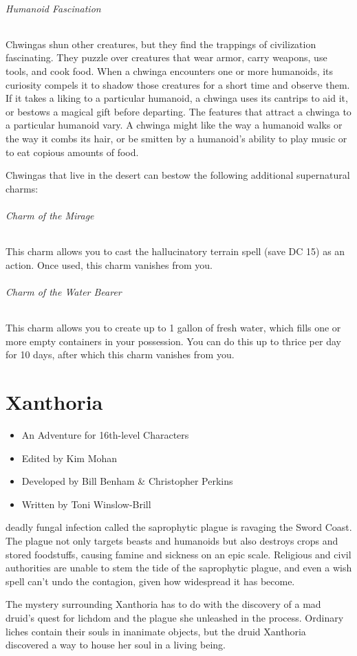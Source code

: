 \documentclass[10pt,a4paper,twoside,bg=print,twocolumn,openany,nodeprecatedcode]{dndbook}
\begin{document}
\subparagraph{Humanoid Fascination}
Chwingas shun other creatures, but they find the trappings of civilization fascinating. They puzzle over creatures that wear armor, carry weapons, use tools, and cook food. When a chwinga encounters one or more humanoids, its curiosity compels it to shadow those creatures for a short time and observe them. If it takes a liking to a particular humanoid, a chwinga uses its cantrips to aid it, or bestows a magical gift before departing. The features that attract a chwinga to a particular humanoid vary. A chwinga might like the way a humanoid walks or the way it combs its hair, or be smitten by a humanoid's ability to play music or to eat copious amounts of food.

Chwingas that live in the desert can bestow the following additional supernatural charms:

\subparagraph{Charm of the Mirage}
This charm allows you to cast the hallucinatory terrain spell (save DC 15) as an action. Once used, this charm vanishes from you.

\subparagraph{Charm of the Water Bearer}
This charm allows you to create up to 1 gallon of fresh water, which fills one or more empty containers in your possession. You can do this up to thrice per day for 10 days, after which this charm vanishes from you.

\chapter{Xanthoria}

\begin{itemize}
\item An Adventure for 16th-level Characters
\item Edited by Kim Mohan
\item Developed by Bill Benham \& Christopher Perkins
\item Written by Toni Winslow-Brill
\end{itemize}

 deadly fungal infection called the saprophytic plague is ravaging the Sword Coast. The plague not only targets beasts and humanoids but also destroys crops and stored foodstuffs, causing famine and sickness on an epic scale. Religious and civil authorities are unable to stem the tide of the saprophytic plague, and even a wish spell can't undo the contagion, given how widespread it has become.


The mystery surrounding Xanthoria has to do with the discovery of a mad druid's quest for lichdom and the plague she unleashed in the process. Ordinary liches contain their souls in inanimate objects, but the druid Xanthoria discovered a way to house her soul in a living being.
\end{document}
